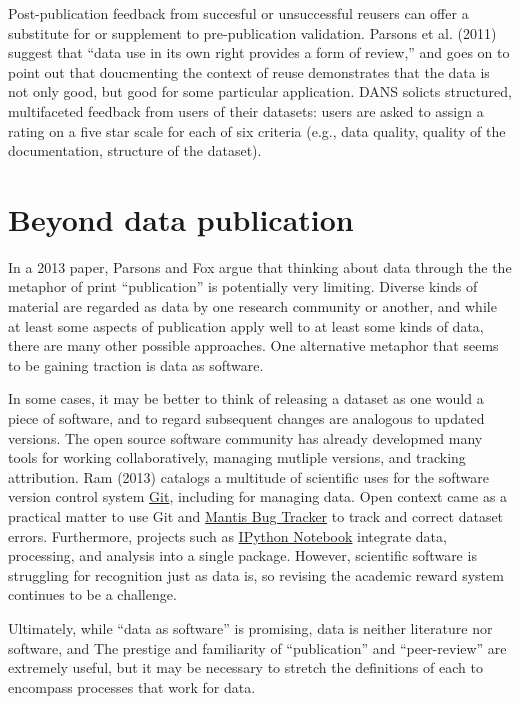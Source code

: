 \documentclass[10pt,twocolumn]{article}
\begin{document}
Post-publication feedback from succesful or unsuccessful reusers can offer a substitute for or supplement to pre-publication validation.
Parsons et al. (2011) suggest that ``data use in its own right provides a form of review,'' and goes on to point out that doucmenting the context of reuse demonstrates that the data is not only good, but good for some particular application.\cite{parsons_data_2011}
DANS solicts structured, multifaceted feedback from users of their datasets: users are asked to assign a rating on a five star scale for each of six criteria (e.g., data quality, quality of the documentation, structure of the dataset).\cite{grootveld_data_2011,grootveld_peer-reviewed_2012}



\section*{Beyond data publication}\label{beyond-data-publication}

In a 2013 paper\cite{parsons_is_2013}, Parsons and Fox argue that thinking about data through the the metaphor of print ``publication'' is potentially very limiting.
Diverse kinds of material are regarded as data by one research community or another, and while at least some aspects of publication apply well to at least some kinds of data, there are many other possible approaches.
One alternative metaphor that seems to be gaining traction is data as software.\cite{schopf_treating_2012}

In some cases, it may be better to think of releasing a dataset as one would a piece of software, and to regard subsequent changes are analogous to updated versions.
The open source software community has already developmed many tools for working collaboratively, managing mutliple versions, and tracking attribution.
Ram (2013)\cite{ram_git_2013} catalogs a multitude of scientific uses for the software version control system \href{http://git-scm.com/}{Git}, including for managing data.
Open context came as a practical matter to use Git and \href{http://www.mantisbt.org/}{Mantis Bug Tracker} to track and correct dataset errors.
Furthermore, projects such as \href{http://ipython.org/notebook}{IPython Notebook} integrate data, processing, and analysis into a single package.
However, scientific software is struggling for recognition\cite{pradal_publishing_2013} just as data is, so revising the academic reward system continues to be a challenge.

Ultimately, while ``data as software'' is promising, data is neither literature nor software, and
The prestige and familiarity of ``publication'' and ``peer-review'' are extremely useful, but it may be necessary to stretch the definitions of each to encompass processes that work for data.
\end{document}
